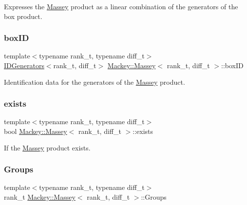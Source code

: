 Expresses the \hyperlink{classMackey_1_1Massey}{Massey} product as a linear combination of the generators of the box product. 

\mbox{\label{classMackey_1_1Massey_ad24cfa697a806bc4468aa12154868447}} 
\subsubsection{\texorpdfstring{box\+ID}{boxID}}
{\footnotesize\ttfamily template$<$typename rank\+\_\+t, typename diff\+\_\+t$>$ \\
\hyperlink{classMackey_1_1IDGenerators}{I\+D\+Generators}$<$rank\+\_\+t, diff\+\_\+t$>$ \hyperlink{classMackey_1_1Massey}{Mackey\+::\+Massey}$<$ rank\+\_\+t, diff\+\_\+t $>$\+::box\+ID}



Identification data for the generators of the \hyperlink{classMackey_1_1Massey}{Massey} product. 

\mbox{\label{classMackey_1_1Massey_a7890eb54ac6d6c48576ba131a59e551f}} 
\subsubsection{\texorpdfstring{exists}{exists}}
{\footnotesize\ttfamily template$<$typename rank\+\_\+t, typename diff\+\_\+t$>$ \\
bool \hyperlink{classMackey_1_1Massey}{Mackey\+::\+Massey}$<$ rank\+\_\+t, diff\+\_\+t $>$\+::exists}



If the \hyperlink{classMackey_1_1Massey}{Massey} product exists. 

\mbox{\label{classMackey_1_1Massey_a221c49aa23c7d7cb9a3d26db9e6e4a94}} 
\subsubsection{\texorpdfstring{Groups}{Groups}}
{\footnotesize\ttfamily template$<$typename rank\+\_\+t, typename diff\+\_\+t$>$ \\
rank\+\_\+t \hyperlink{classMackey_1_1Massey}{Mackey\+::\+Massey}$<$ rank\+\_\+t, diff\+\_\+t $>$\+::Groups}



